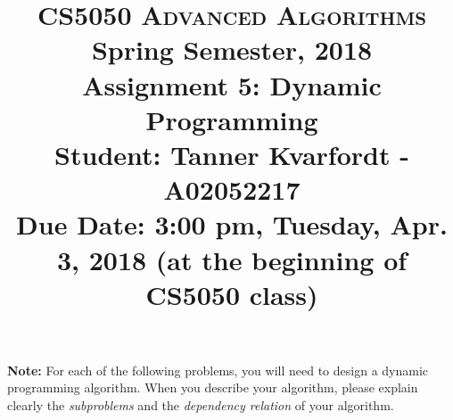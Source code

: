 \documentclass[11pt]{article}
\begin{document}
\baselineskip=14.0pt

\title{CS5050 \textsc{Advanced Algorithms}
\\{\Large Spring Semester, 2018}
\\ Assignment 5: Dynamic Programming
\\ {\large \textbf{Student:} Tanner Kvarfordt - A02052217}
\\ {\large {\bf Due Date: 3:00 pm}, Tuesday, Apr. 3, 2018 ({\bf at the beginning of CS5050 class})}}
\date{}


\maketitle

\vspace{-0.6in}

\noindent
{\bf Note:} For each of the following problems, you will need to
design a dynamic programming algorithm. When you describe your algorithm,
please explain clearly the {\em subproblems} and the {\em dependency
relation} of your algorithm.
\end{document}
